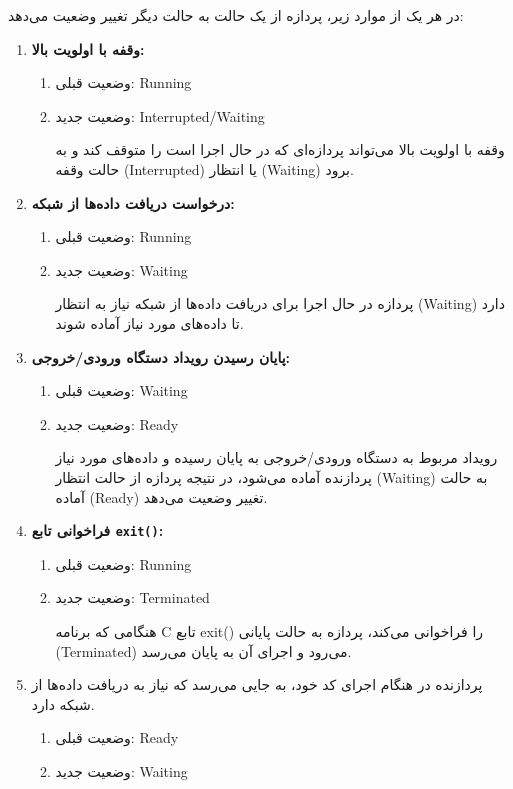 \begin{qsolve}
در هر یک از موارد زیر، پردازه از یک حالت به حالت دیگر تغییر وضعیت می‌دهد:
\begin{enumerate}
	\item \textbf{وقفه با اولویت بالا:}
	\begin{enumerate}
		\item وضعیت قبلی: Running
		\item وضعیت جدید: Interrupted/Waiting
		
		 وقفه با اولویت بالا می‌تواند پردازه‌ای که در حال اجرا است را متوقف کند و به حالت وقفه (Interrupted) یا انتظار (Waiting) برود.
	\end{enumerate}
	\item \textbf{درخواست دریافت داده‌ها از شبکه:}
	\begin{enumerate}
		\item وضعیت قبلی: Running
		\item وضعیت جدید: Waiting
		
		 پردازه در حال اجرا برای دریافت داده‌ها از شبکه نیاز به انتظار (Waiting) دارد تا داده‌های مورد نیاز آماده شوند.
	\end{enumerate}
	\item \textbf{پایان رسیدن رویداد دستگاه ورودی/خروجی:}
	\begin{enumerate}
		\item وضعیت قبلی: Waiting
		\item وضعیت جدید: Ready
		
		 رویداد مربوط به دستگاه ورودی/خروجی به پایان رسیده و داده‌های مورد نیاز پردازنده آماده می‌شود، در نتیجه پردازه از حالت انتظار (Waiting) به حالت آماده (Ready) تغییر وضعیت می‌دهد.
	\end{enumerate}
	\item \textbf{فراخوانی تابع \texttt{exit()}:}
	\begin{enumerate}
		\item وضعیت قبلی: Running
		\item وضعیت جدید: Terminated
		
		 هنگامی که برنامه C تابع exit() را فراخوانی می‌کند، پردازه به حالت پایانی (Terminated) می‌رود و اجرای آن به پایان می‌رسد.
	\end{enumerate}
	\item پردازنده در هنگام اجرای کد خود، به جایی می‌رسد که نیاز به دریافت داده‌ها از شبکه دارد.
	\begin{enumerate}
		\item وضعیت قبلی: Ready
		\item وضعیت جدید: Waiting
	\end{enumerate}
\end{enumerate}

\end{qsolve}